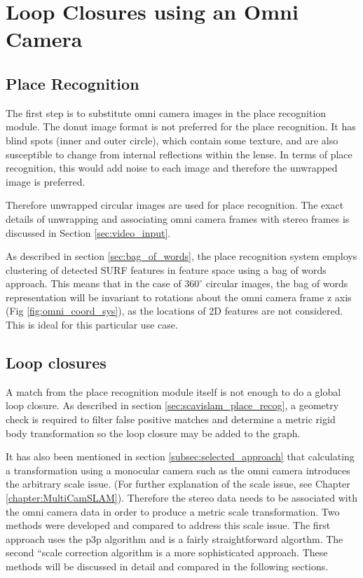 \chapter{Loop Closures using an Omni Camera}
\label{chapter:omni_loop_close}

\section{Place Recognition}

The first step is to substitute omni camera images in the place recognition module. The donut image format is not preferred for the place recognition.  It has blind spots (inner and outer circle), which contain some texture, and are also susceptible to change from internal reflections within the lense.  In terms of place recognition, this would add noise to each image and therefore the unwrapped image is preferred.

Therefore unwrapped circular images are used for place recognition.  The exact details of unwrapping and associating omni camera frames with stereo frames is discussed in Section \ref{sec:video_input}.

As described in section \ref{sec:bag_of_words}, the place recognition system employs clustering of detected SURF features in feature space using a bag of words approach.  This means that in the case of $360^\circ$ circular images, the bag of words representation will be invariant to rotations about the omni camera frame z axis (Fig \ref{fig:omni_coord_sys}), as the locations of 2D features are not considered.  This is ideal for this particular use case.

\section{Loop closures}
\label{sec:calc_loop_edge}

A match from the place recognition module itself is not enough to do a global loop closure.  As described in section \ref{sec:scavislam_place_recog}, a geometry check is required to filter false positive matches and determine a metric rigid body transformation so the loop closure may be added to the graph.

It has also been mentioned in section \ref{subsec:selected_approach} that calculating a transformation using a monocular camera such as the omni camera introduces the arbitrary scale issue.  (For further explanation of the scale issue, see Chapter \ref{chapter:MultiCamSLAM}). Therefore the stereo data needs to be associated with the omni camera data in order to produce a metric scale transformation.  Two methods were developed and compared to address this scale issue.  The first approach uses the p3p algorithm and is a fairly straightforward algorthm.  The second ``scale correction algorithm is a more sophisticated approach.  These methods will be discussed in detail and compared in the following sections. 

